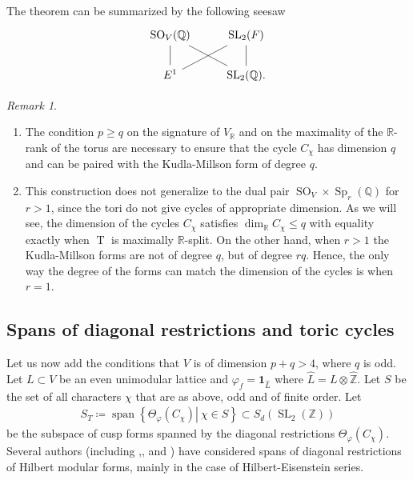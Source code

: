 \documentclass[11pt]{article} %
\newcommand{\8}{\infty}
\newcommand{\Z}{\mathbb{Z}}
\newcommand{\id}{\mathbf{1}}
\newcommand{\Tbf}{\operatorname{T}}
\newcommand{\Span}{\operatorname{span}}
\newcommand{\SO}{\operatorname{SO}}
\newcommand{\SL}{\operatorname{SL}}
\newcommand{\Sp}{\operatorname{Sp}}
\newcommand{\R}{\mathbb{R}}
\newcommand{\Q}{\mathbb{Q}}
\newcommand{\Zhat}{\widehat{\Z}}
\newcommand{\Lhat}{\widehat{L}}
\newcommand{\fin}{f}
\theoremstyle{mytheoremstyle}
\theoremstyle{remark}
\newtheorem{rmk}{Remark}[section]
\numberwithin{equation}{section}
\begin{document}
The theorem can be summarized by the following seesaw 
\[
\begin{tikzcd}
\SO_V(\Q) \arrow[dash, dr] & \SL_2(F) \\
E^1 \arrow[dash]{u} \arrow[dash, ru] & \SL_2(\Q). \arrow[dash]{u}
\end{tikzcd}
\]
\begin{rmk}\begin{enumerate}
\item The condition $p \geq q$ on the signature of $V_\R$ and on the maximality of the $\R$-rank of the torus are necessary to ensure that the cycle $C_{\chi}$ has dimension $q$ and can be paired with the Kudla-Millson form of degree $q$.
\item This construction does not generalize to the dual pair $\SO_V \times \Sp_r(\Q)$ for $r>1$, since the tori do not give cycles of appropriate dimension. As we will see, the dimension of the cycles $C_\chi$ satisfies $\dim_\R C_\chi \leq q$ with equality exactly when $\Tbf$ is maximally $\R$-split. On the other hand, when $r>1$ the Kudla-Millson forms are not of degree $q$, but of degree $rq$. Hence, the only way the degree of the forms can match the dimension of the cycles is when $r=1$.
\end{enumerate}
\end{rmk}

\subsection{Spans of diagonal restrictions and toric cycles} Let us now add the conditions that $V$ is of dimension $p+q>4$, where $q$ is odd. { Let $L \subset V$ be an even unimodular lattice and $\varphi_\fin=\id_{\Lhat}$ where $\Lhat=L \otimes \Zhat$}. Let $S$ be the set of all characters $\chi$ that are as above, odd and of finite order. Let 
\begin{align}
    S_T  \coloneqq \Span\left \{ \left . \Theta_\varphi(C_\chi) \right \vert \ \chi \in S \right \}\subset S_{d}(\SL_2(\Z))
\end{align} be the subspace of cusp forms spanned by the diagonal restrictions $\Theta_\varphi(C_\chi)$. Several authors (including \cite{lieis},\cite{bogoli},\cite{keapit} and \cite{yang} ) have considered spans of diagonal restrictions of Hilbert modular forms, mainly in the case of Hilbert-Eisenstein series.
\end{document}
